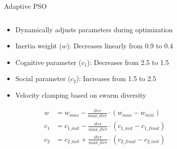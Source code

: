 \documentclass[aspectratio=169,xcolor=table]{beamer}
\begin{document}
\begin{frame}{Adaptive PSO}
  \begin{columns}
    \begin{column}{0.55\textwidth}
      \begin{tcolorbox}[
        enhanced,
        colback=blue!5,
        colframe=blue!70,
        arc=2mm,
        title=Adaptive Parameters,
        fonttitle=\bfseries\large,
        boxrule=0.5mm
      ]
        \begin{itemize}
          \item Dynamically adjusts parameters during optimization
          \item Inertia weight ($w$): Decreases linearly from 0.9 to 0.4
          \item Cognitive parameter ($c_1$): Decreases from 2.5 to 1.5
          \item Social parameter ($c_2$): Increases from 1.5 to 2.5
          \item Velocity clamping based on swarm diversity
        \end{itemize}
      \end{tcolorbox}
      
      \vspace{0.3cm}
      
      \begin{tcolorbox}[
        enhanced,
        colback=green!5,
        colframe=green!70,
        arc=2mm,
        title=Adaptation Formulas,
        fonttitle=\bfseries\large,
        boxrule=0.5mm
      ]
        \begin{align}
          w &= w_{max} - \frac{iter}{max\_iter} \cdot (w_{max} - w_{min}) \\
          c_1 &= c_{1\_init} - \frac{iter}{max\_iter} \cdot (c_{1\_init} - c_{1\_final}) \\
          c_2 &= c_{2\_init} + \frac{iter}{max\_iter} \cdot (c_{2\_final} - c_{2\_init})
        \end{align}
      \end{tcolorbox}
    \end{column}
    
    \begin{column}{0.45\textwidth}
\end{column}
\end{columns}
\end{frame}
\end{document}
